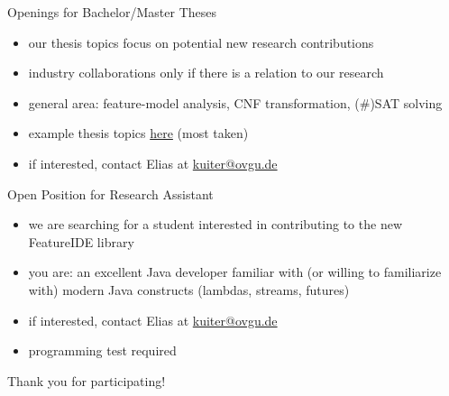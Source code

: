 \documentclass[
	aspectratio=169, %
	8pt, %
]{beamer}
\begin{document}
\begin{frame}{\myframetitle}
	\begin{mycolumns}[t]
		\begin{note}{Openings for Bachelor/Master Theses}
			\begin{itemize}
				\item our thesis topics focus on potential new research contributions
				\item industry collaborations only if there is a relation to our research
				\item general area: feature-model analysis, CNF transformation, (\#)SAT solving
				\item example thesis topics \href{https://www.uni-ulm.de/fileadmin/website_uni_ulm/iui.inst.170/projects/spldev/thesis_topics_22-06-29.pdf}{here} (most taken)
				\item if interested, contact Elias at \href{mailto:kuiter@ovgu.de}{kuiter@ovgu.de}
			\end{itemize}
		\end{note}
	\mynextcolumn
		\begin{note}{Open Position for Research Assistant}
			\begin{itemize}
				\item we are searching for a student interested in contributing to the new FeatureIDE library
				\item you are: an excellent Java developer familiar with (or willing to familiarize with) modern Java constructs (lambdas, streams, futures)
				\item if interested, contact Elias at \href{mailto:kuiter@ovgu.de}{kuiter@ovgu.de}
				\item programming test required
			\end{itemize}
		\end{note}
	\end{mycolumns}
\end{frame}

\begin{frame}{}
	\centering\Huge Thank you for participating!
\end{frame}


\end{document}
